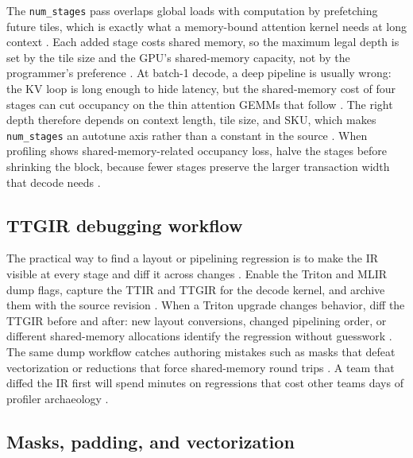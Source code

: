 The \texttt{num\_stages} pass overlaps global loads with computation by prefetching future tiles, which is exactly what a memory-bound attention kernel needs at long context \citep{tritonlang2024,semianalysis2024tma}. Each added stage costs shared memory, so the maximum legal depth is set by the tile size and the GPU's shared-memory capacity, not by the programmer's preference \citep{nvidia2022hopper,memoryfloor2026}. At batch-1 decode, a deep pipeline is usually wrong: the KV loop is long enough to hide latency, but the shared-memory cost of four stages can cut occupancy on the thin attention GEMMs that follow \citep{taxbreak2026,patel2025llminference}. The right depth therefore depends on context length, tile size, and SKU, which makes \texttt{num\_stages} an autotune axis rather than a constant in the source \citep{tritonlang2024,nvidia2022hopper}. When profiling shows shared-memory-related occupancy loss, halve the stages before shrinking the block, because fewer stages preserve the larger transaction width that decode needs \citep{memoryfloor2026,semianalysis2024tma}.

\subsection{TTGIR debugging workflow}

The practical way to find a layout or pipelining regression is to make the IR visible at every stage and diff it across changes \citep{tritonlang2024,chen2020compilerbasedhardw}. Enable the Triton and MLIR dump flags, capture the TTIR and TTGIR for the decode kernel, and archive them with the source revision \citep{tritonlang2024}. When a Triton upgrade changes behavior, diff the TTGIR before and after: new layout conversions, changed pipelining order, or different shared-memory allocations identify the regression without guesswork \citep{memoryfloor2026,patel2025llminference}. The same dump workflow catches authoring mistakes such as masks that defeat vectorization or reductions that force shared-memory round trips \citep{tritonlang2024,memoryfloor2026}. A team that diffed the IR first will spend minutes on regressions that cost other teams days of profiler archaeology \citep{taxbreak2026,chen2020compilerbasedhardw}.

\subsection{Masks, padding, and vectorization}

